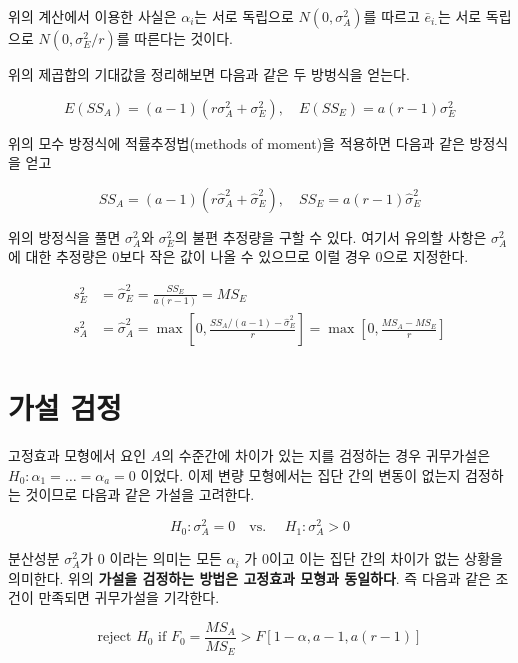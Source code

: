 \documentclass[
]{book}
\theoremstyle{definition}
\theoremstyle{definition}
\theoremstyle{definition}
\theoremstyle{remark}
\begin{document}
위의 계산에서 이용한 사실은 \(\alpha_i\)는 서로 독립으로 \(N(0,\sigma^2_A)\)를 따르고
\(\bar e_{i.}\)는 서로 독립으로 \(N(0,\sigma^2_E/r)\)를 따른다는 것이다.

위의 제곱합의 기대값을 정리해보면 다음과 같은 두 방벙식을 얻는다.

\begin{equation}
E(SS_A) = (a-1)(r\sigma^2_A+ \sigma^2_E), \quad E(SS_E) =  a(r-1) \sigma^2_E 
\end{equation}

위의 모수 방정식에 적률추정법(methods of moment)을 적용하면 다음과 같은 방정식을 얻고

\begin{equation}
SS_A = (a-1)(r \hat{\sigma}^2_A+ \hat{\sigma}^2_E), \quad SS_E =  a(r-1) \hat{\sigma}^2_E 
\end{equation}

위의 방정식을 풀면 \(\sigma^2_A\)와 \(\sigma^2_E\)의 불편 추정량을 구할 수 있다. 여기서 유의할 사항은 \(\sigma^2_A\)에 대한 추정량은 0보다 작은 값이 나올 수 있으므로 이럴 경우 0으로 지정한다.

\begin{align*} 
 s^2_E & = \hat \sigma^2_E = \frac{SS_E}{a(r-1)} =MS_E\\
 s^2_A & = \hat \sigma^2_A = \max \left [ 0, \frac{SS_A/(a-1) -\hat \sigma^2_E}{r} \right ] 
 =\max \left [ 0, \frac{MS_A -MS_E}{r} \right ]
\end{align*}

\hypertarget{uxac00uxc124-uxac80uxc815}{%
\section{가설 검정}\label{uxac00uxc124-uxac80uxc815}}

고정효과 모형에서 요인 \(A\)의 수준간에 차이가 있는 지를 검정하는 경우 귀무가설은 \(H_0: \alpha_1=\dots=\alpha_a=0\) 이었다. 이제 변량 모형에서는 집단 간의 변동이 없는지 검정하는 것이므로 다음과 같은 가설을 고려한다.

\begin{equation}
H_0 : \sigma_A^2 = 0 \quad \text{vs. } \quad H_1: \sigma^2_A >0 
\label{eq:hypo}
\end{equation}

분산성분 \(\sigma_A^2\)가 0 이라는 의미는 모든 \(\alpha_i\) 가 0이고 이는 집단 간의 차이가 없는 상황을 의미한다. 위의 \textbf{가설을 검정하는 방법은 고정효과 모형과 동일하다}. 즉 다음과 같은 조건이 만족되면 귀무가설을 기각한다.

\[ \text{reject } H_0 \text{ if } F_0 = \frac{MS_A}{MS_E} > F[1-\alpha, a-1,a(r-1)] \]
\end{document}
